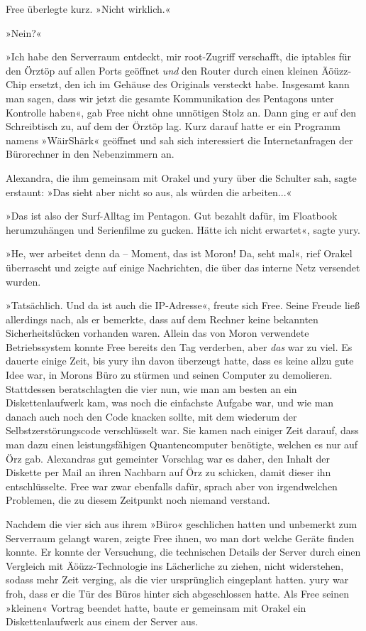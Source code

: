 Free überlegte kurz. »Nicht wirklich.«

»Nein?«

»Ich habe den Serverraum entdeckt, mir root-Zugriff verschafft, die iptables für den Örztöp auf allen Ports geöffnet \emph{und} den Router durch einen kleinen Äöüzz-Chip ersetzt, den ich im Gehäuse des Originals versteckt habe. Insgesamt kann man sagen, dass wir jetzt die gesamte Kommunikation des Pentagons unter Kontrolle haben«, gab Free nicht ohne unnötigen Stolz an. Dann ging er auf den Schreibtisch zu, auf dem der Örztöp lag. Kurz darauf hatte er ein Programm namens »WäirShärk« geöffnet und sah sich interessiert die Internetanfragen der Bürorechner in den Nebenzimmern an.

Alexandra, die ihm gemeinsam mit Orakel und yury über die Schulter sah, sagte erstaunt: »Das sieht aber nicht so aus, als würden die arbeiten...«

»Das ist also der Surf-Alltag im Pentagon. Gut bezahlt dafür, im Floatbook herumzuhängen und Serienfilme zu gucken. Hätte ich nicht erwartet«, sagte yury.

»He, wer arbeitet denn da – Moment, das ist Moron! Da, seht mal«, rief Orakel überrascht und zeigte auf einige Nachrichten, die über das interne Netz versendet wurden.

»Tatsächlich. Und da ist auch die IP-Adresse«, freute sich Free. Seine Freude ließ allerdings nach, als er bemerkte, dass auf dem Rechner keine bekannten Sicherheitslücken vorhanden waren. Allein das von Moron verwendete Betriebssystem konnte Free bereits den Tag verderben, aber \emph{das} war zu viel. Es dauerte einige Zeit, bis yury ihn davon überzeugt hatte, dass es keine allzu gute Idee war, in Morons Büro zu stürmen und seinen Computer zu demolieren. Stattdessen beratschlagten die vier nun, wie man am besten an ein Diskettenlaufwerk kam, was noch die einfachste Aufgabe war, und wie man danach auch noch den Code knacken sollte, mit dem wiederum der Selbstzerstörungscode verschlüsselt war. Sie kamen nach einiger Zeit darauf, dass man dazu einen leistungsfähigen Quantencomputer benötigte, welchen es nur auf Örz gab. Alexandras gut gemeinter Vorschlag war es daher, den Inhalt der Diskette per Mail an ihren Nachbarn auf Örz zu schicken, damit dieser ihn entschlüsselte. Free war zwar ebenfalls dafür, sprach aber von irgendwelchen Problemen, die zu diesem Zeitpunkt noch niemand verstand.

Nachdem die vier sich aus ihrem »Büro« geschlichen hatten und unbemerkt zum Serverraum gelangt waren, zeigte Free ihnen, wo man dort welche Geräte finden konnte. Er konnte der Versuchung, die technischen Details der Server durch einen Vergleich mit Äöüzz-Technologie ins Lächerliche zu ziehen, nicht widerstehen, sodass mehr Zeit verging, als die vier ursprünglich eingeplant hatten. yury war froh, dass er die Tür des Büros hinter sich abgeschlossen hatte. Als Free seinen »kleinen« Vortrag beendet hatte, baute er gemeinsam mit Orakel ein Diskettenlaufwerk aus einem der Server aus.

